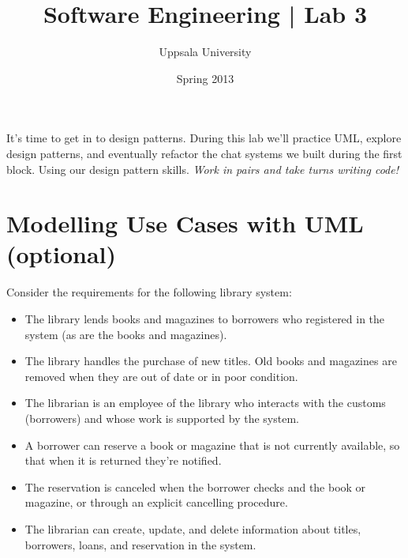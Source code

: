 \documentclass{article}
\begin{document}
  \title{ Software Engineering | Lab 3 }
  \author{ Uppsala University }
  \date{ Spring 2013 }
  \maketitle

  \lstset{language=[Sharp]C}

  \section*{}
    It's time to get in to design patterns. During this lab we'll practice UML, explore design patterns, and eventually refactor the chat systems we built during the first block. Using our design pattern skills. \emph{Work in pairs and take turns writing code!}







\pagebreak
  \section{Modelling Use Cases with UML (optional)}

  Consider the requirements for the following library system:

  \begin{itemize}
  \item The library lends books and magazines to borrowers who registered in the system (as are the books and magazines).
  \item The library handles the purchase of new titles. Old books and magazines are removed when they are out of date or in poor condition.
  \item The librarian is an employee of the library who interacts with the customs (borrowers) and whose work is supported by the system.
  \item A borrower can reserve a book or magazine that is not currently available, so that when it is returned they're notified.
  \item The reservation is canceled when the borrower checks and the book or magazine, or through an explicit cancelling procedure.
  \item The librarian can create, update, and delete information about titles, borrowers, loans, and reservation in the system.
  \end{itemize}

\vspace{0.3cm}
\end{document}
